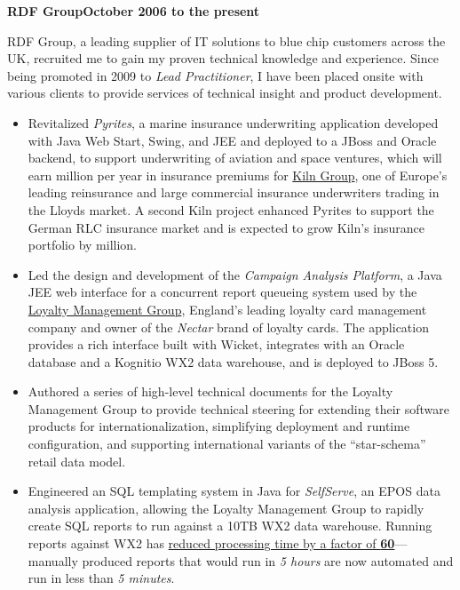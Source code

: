 \documentclass[a4paper,12pt]{article}
\newcommand{\head}[1]{\begin{center}{\large{\textbf{\sc{#1}}}}\nopagebreak\end{center}}
\newcommand{\jobheld}[2]{\textbf{#1\hfill #2}\nopagebreak}
\newcommand{\clientwork}[2]{\emph{#1\hfill #2}\nopagebreak}
\begin{document}
\head{Professional Experience}

\jobheld{RDF Group}{October 2006 to the present}

RDF Group, a leading supplier of IT solutions to blue chip customers across the UK, recruited me to gain my proven technical knowledge and experience.  Since being promoted in 2009 to \emph{Lead Practitioner}, I have been placed onsite with various clients to provide services of technical insight and product development.


\begin{itemize}

\item Revitalized \emph{Pyrites}, a marine insurance underwriting application developed with Java Web Start, Swing, and JEE and deployed to a JBoss and Oracle backend, to support underwriting of aviation and space ventures, which will earn  million per year in insurance premiums for \href{http://www.kilngroup.com/}{Kiln Group}, one of Europe's leading reinsurance and large commercial insurance underwriters trading in the Lloyds market.  A second Kiln project enhanced Pyrites to support the German RLC insurance market and is expected to grow  Kiln's insurance portfolio by  million.

\item Led the design and development of the \emph{Campaign Analysis Platform}, a Java JEE web interface for a concurrent report queueing system used by the \href{http://www.loyalty.co.uk/}{Loyalty Management Group}, England's leading loyalty card management company and owner of the \emph{Nectar} brand of loyalty cards.  The application provides a rich interface built with Wicket, integrates with an Oracle database and a Kognitio WX2 data warehouse, and is deployed to JBoss 5.

\end{itemize}


\begin{itemize}

\item Authored a series of high-level technical documents for the Loyalty Management Group to provide technical steering for extending their software products for internationalization, simplifying deployment and runtime configuration, and supporting international variants of the ``star-schema'' retail data model.

\item Engineered an SQL templating system in Java for \emph{SelfServe}, an EPOS data analysis application, allowing the Loyalty Management Group to rapidly create SQL reports to run against a 10TB WX2 data warehouse.  Running reports against WX2 has \href{http://www.kognitio.com/casestudies/casestudy_lmg.php}{reduced processing time by a factor of \textbf{60}}---manually produced reports that would run in \emph{5 hours} are now automated and run in less than \emph{5 minutes}.

\end{itemize}
\end{document}
